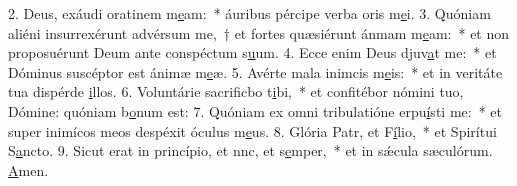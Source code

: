 2. Deus, exáudi oratinem m\uline{e}am:~* áuribus pércipe verba oris m\uline{e}i.
3. Quóniam aliéni insurrexérunt advérsum me,~† et fortes quæsiérunt ánmam m\uline{e}am:~* et non proposuérunt Deum ante conspéctum s\uline{u}um.
4. Ecce enim Deus djuv\uline{a}t me:~* et Dóminus suscéptor est ánimæ m\uline{e}æ.
5. Avérte mala inimcis m\uline{e}is:~* et in veritáte tua dispérde \uline{i}llos.
6. Voluntárie sacrificbo t\uline{i}bi,~* et confitébor nómini tuo, Dómine: quóniam b\uline{o}num est:
7. Quóniam ex omni tribulatióne erpu\uline{í}sti me:~* et super inimícos meos despéxit óculus m\uline{e}us.
8. Glória Patr, et F\uline{í}lio,~* et Spirítui S\uline{a}ncto.
9. Sicut erat in princípio, et nnc, et s\uline{e}mper,~* et in sǽcula sæculórum. \uline{A}men.
